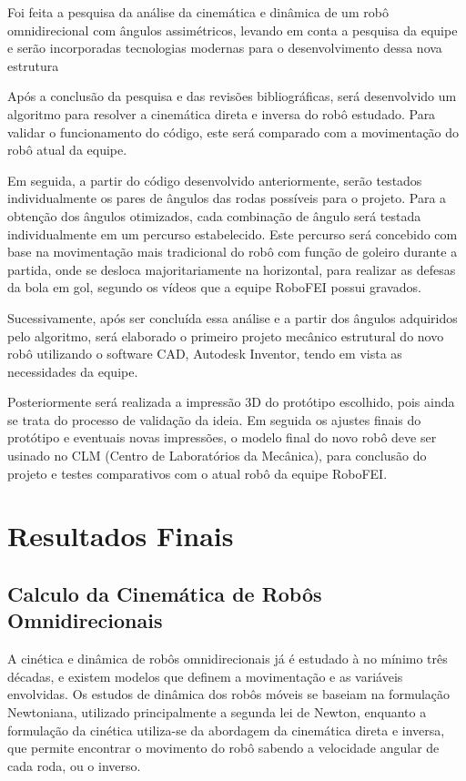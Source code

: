 \documentclass[deposito, acronym, symbols]{fei}
\begin{document}
Foi feita a pesquisa da análise da cinemática e dinâmica de um robô omnidirecional com ângulos assimétricos, levando em conta a pesquisa da equipe \textcite{Twente} e serão incorporadas tecnologias modernas para o desenvolvimento dessa nova estrutura

Após a conclusão da pesquisa e das revisões bibliográficas, será desenvolvido um algoritmo para resolver a cinemática direta e inversa do robô estudado. Para validar o funcionamento do código, este será comparado com a movimentação do robô atual da equipe.

Em seguida, a partir do código desenvolvido anteriormente, serão testados individualmente os pares de ângulos das rodas possíveis para o projeto. Para a obtenção dos ângulos otimizados, cada combinação de ângulo será testada individualmente em um percurso estabelecido. Este percurso será concebido com base na movimentação mais tradicional do robô com função de goleiro durante a partida, onde se desloca majoritariamente na horizontal, para realizar as defesas da bola em gol, segundo os vídeos que a equipe RoboFEI possui gravados.

Sucessivamente, após ser concluída essa análise e a partir dos ângulos adquiridos pelo algoritmo, será elaborado o primeiro projeto mecânico estrutural do novo robô utilizando o software CAD, Autodesk Inventor, tendo em vista as necessidades da equipe.

Posteriormente será realizada a impressão 3D do protótipo escolhido, pois ainda se trata do processo de validação da ideia. Em seguida os ajustes finais do protótipo e eventuais novas impressões, o modelo final do novo robô deve ser usinado no CLM (Centro de Laboratórios da Mecânica), para conclusão do projeto e testes comparativos com o atual robô da equipe RoboFEI.

\chapter{Resultados Finais}

\section{Calculo da Cinemática de Robôs Omnidirecionais}

A cinética e dinâmica de robôs omnidirecionais já é estudado à no mínimo três décadas, e existem modelos que definem a movimentação e as variáveis envolvidas. Os estudos de dinâmica dos robôs móveis se baseiam na formulação Newtoniana, utilizado principalmente a segunda lei de Newton, enquanto a formulação da cinética utiliza-se da abordagem da cinemática direta e inversa, que permite encontrar o movimento do robô sabendo a velocidade angular de cada roda, ou o inverso. 
\end{document}
